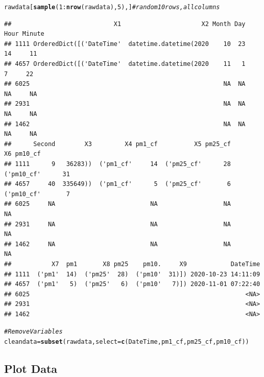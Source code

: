 \documentclass{article}\usepackage[]{graphicx}\usepackage[]{color}
\makeatletter
\newcommand{\hlnum}[1]{\textcolor[rgb]{0.686,0.059,0.569}{#1}}%
\newcommand{\hlcom}[1]{\textcolor[rgb]{0.678,0.584,0.686}{\textit{#1}}}%
\newcommand{\hlopt}[1]{\textcolor[rgb]{0,0,0}{#1}}%
\newcommand{\hlstd}[1]{\textcolor[rgb]{0.345,0.345,0.345}{#1}}%
\newcommand{\hlkwb}[1]{\textcolor[rgb]{0.69,0.353,0.396}{#1}}%
\newcommand{\hlkwc}[1]{\textcolor[rgb]{0.333,0.667,0.333}{#1}}%
\newcommand{\hlkwd}[1]{\textcolor[rgb]{0.737,0.353,0.396}{\textbf{#1}}}%
\newenvironment{kframe}{%
 \def\at@end@of@kframe{}%
 \ifinner\ifhmode%
  \def\at@end@of@kframe{\end{minipage}}%
  \begin{minipage}{\columnwidth}%
 \fi\fi%
 \def\FrameCommand##1{\hskip\@totalleftmargin \hskip-\fboxsep
 \colorbox{shadecolor}{##1}\hskip-\fboxsep
     \hskip-\linewidth \hskip-\@totalleftmargin \hskip\columnwidth}%
 \MakeFramed {\advance\hsize-\width
   \@totalleftmargin\z@ \linewidth\hsize
   \@setminipage}}%
 {\par\unskip\endMakeFramed%
 \at@end@of@kframe}
\newenvironment{knitrout}{}{} %
\makeatother
\begin{document}
\begin{knitrout}
\color{fgcolor}\begin{kframe}
\begin{alltt}
\hlstd{rawdata[}\hlkwd{sample}\hlstd{(}\hlnum{1}\hlopt{:}\hlkwd{nrow}\hlstd{(rawdata),} \hlnum{5}\hlstd{),]} \hlcom{# random 10 rows, all columns}
\end{alltt}
\begin{verbatim}
##                            X1                      X2 Month Day Hour Minute
## 1111 OrderedDict([('DateTime'  datetime.datetime(2020    10  23   14     11
## 4657 OrderedDict([('DateTime'  datetime.datetime(2020    11   1    7     22
## 6025                                                     NA  NA   NA     NA
## 2931                                                     NA  NA   NA     NA
## 1462                                                     NA  NA   NA     NA
##      Second        X3         X4 pm1_cf          X5 pm25_cf          X6 pm10_cf
## 1111      9   36283))  ('pm1_cf'     14  ('pm25_cf'      28  ('pm10_cf'      31
## 4657     40  335649))  ('pm1_cf'      5  ('pm25_cf'       6  ('pm10_cf'       7
## 6025     NA                          NA                  NA                  NA
## 2931     NA                          NA                  NA                  NA
## 1462     NA                          NA                  NA                  NA
##           X7  pm1       X8 pm25    pm10.     X9            DateTime
## 1111  ('pm1'  14)  ('pm25'  28)  ('pm10'  31)]) 2020-10-23 14:11:09
## 4657  ('pm1'   5)  ('pm25'   6)  ('pm10'   7)]) 2020-11-01 07:22:40
## 6025                                                           <NA>
## 2931                                                           <NA>
## 1462                                                           <NA>
\end{verbatim}
\begin{alltt}
\hlcom{# Remove Variables}
\hlstd{cleandata} \hlkwb{=} \hlkwd{subset}\hlstd{(rawdata,} \hlkwc{select}\hlstd{=}\hlkwd{c}\hlstd{(DateTime, pm1_cf, pm25_cf, pm10_cf))}
\end{alltt}
\end{kframe}
\end{knitrout}

\subsection{Plot Data}
\end{document}
